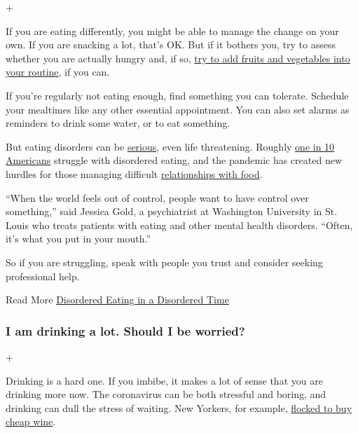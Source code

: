 +

If you are eating differently, you might be able to manage the change on
your own. If you are snacking a lot, that's OK. But if it bothers you,
try to assess whether you are actually hungry and, if so,
\href{https://www.nytimes.com/2020/04/20/well/eat/coronavirus-diet-metabolic-health.html}{try
to add fruits and vegetables into your routine}, if you can.

If you're regularly not eating enough, find something you can tolerate.
Schedule your mealtimes like any other essential appointment. You can
also set alarms as reminders to drink some water, or to eat something.

But eating disorders can be
\href{https://www.nytimes.com/2020/05/03/sports/athletes-eating-disorders.html}{serious},
even life threatening. Roughly
\href{http://eatingdisorderscoalition.org.s208556.gridserver.com/couch/uploads/file/Eating\%20Disorders\%20Fact\%20Sheet.pdf}{one
in 10 Americans} struggle with disordered eating, and the pandemic has
created new hurdles for those managing difficult
\href{https://www.nytimes.com/2020/05/12/well/mind/i-have-an-eating-disorder-but-cant-escape-the-kitchen.html}{relationships
with food}.

``When the world feels out of control, people want to have control over
something,'' said Jessica Gold, a psychiatrist at Washington University
in St. Louis who treats patients with eating and other mental health
disorders. ``Often, it's what you put in your mouth.''

So if you are struggling, speak with people you trust and consider
seeking professional help.

 Read More
\href{https://www.nytimes.com/2020/06/05/health/eating-disorders-coronavirus.html}{Disordered
Eating in a Disordered Time}

\hypertarget{i-am-drinking-a-lot-should-i-be-worried}{%
\subsubsection{I am drinking a lot. Should I be
worried?}\label{i-am-drinking-a-lot-should-i-be-worried}}

+

Drinking is a hard one. If you imbibe, it makes a lot of sense that you
are drinking more now. The coronavirus can be both stressful and boring,
and drinking can dull the stress of waiting. New Yorkers, for example,
\href{https://www.nytimes.com/2020/04/23/nyregion/coronavirus-liquor-stores-nyc.html}{flocked
to buy cheap wine}.

